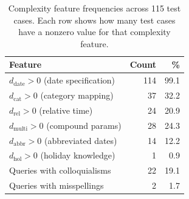 \begin{table}[h]
\centering
\small
\caption{Complexity feature frequencies across 115 test cases. Each row shows how many test cases have a nonzero value for that complexity feature.}
\label{tab:complexity_freq}
\begin{tabular}{@{}lrr@{}}
\toprule
\textbf{Feature} & \textbf{Count} & \textbf{\%} \\
\midrule
$d_{\text{date}} > 0$ (date specification) & 114 & 99.1 \\
$d_{\text{cat}} > 0$ (category mapping) & 37 & 32.2 \\
$d_{\text{rel}} > 0$ (relative time) & 24 & 20.9 \\
$d_{\text{multi}} > 0$ (compound params) & 28 & 24.3 \\
$d_{\text{abbr}} > 0$ (abbreviated dates) & 14 & 12.2 \\
$d_{\text{hol}} > 0$ (holiday knowledge) & 1 & 0.9 \\
\midrule
Queries with colloquialisms & 22 & 19.1 \\
Queries with misspellings & 2 & 1.7 \\
\bottomrule
\end{tabular}
\end{table}